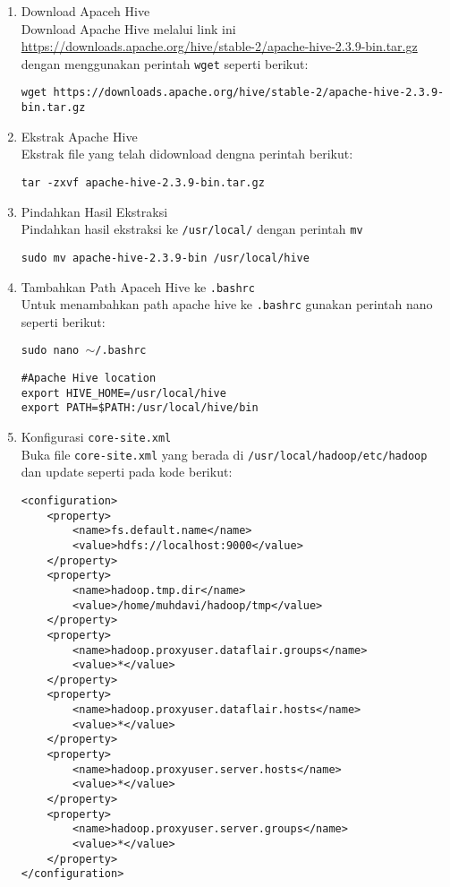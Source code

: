 \documentclass[a4paper]{tufte-handout}
\begin{document}
\begin{enumerate}
\item Download Apaceh Hive \\
Download Apache Hive melalui link ini \url{https://downloads.apache.org/hive/stable-2/apache-hive-2.3.9-bin.tar.gz} dengan menggunakan perintah {\tt wget} seperti berikut:

{\tt wget https://downloads.apache.org/hive/stable-2/apache-hive-2.3.9-bin.tar.gz}

\item Ekstrak Apache Hive \\
Ekstrak file yang telah didownload dengna perintah berikut:

{\tt tar -zxvf apache-hive-2.3.9-bin.tar.gz}

\item Pindahkan Hasil Ekstraksi \\
Pindahkan hasil ekstraksi ke {\tt /usr/local/} dengan perintah {\tt mv}

{\tt sudo mv apache-hive-2.3.9-bin /usr/local/hive}

\item Tambahkan Path Apaceh Hive ke {\tt .bashrc} \\
Untuk menambahkan path apache hive ke {\tt .bashrc} gunakan perintah nano
seperti berikut:

{\tt sudo nano $\sim$/.bashrc}

\begin{lstlisting}
#Apache Hive location
export HIVE_HOME=/usr/local/hive
export PATH=$PATH:/usr/local/hive/bin
\end{lstlisting}

\item Konfigurasi {\tt core-site.xml} \\
Buka file {\tt core-site.xml} yang berada di {\tt /usr/local/hadoop/etc/hadoop} dan update seperti pada kode berikut:

\begin{lstlisting}
<configuration>
	<property>
		<name>fs.default.name</name>
		<value>hdfs://localhost:9000</value>
	</property>
	<property>
		<name>hadoop.tmp.dir</name>
		<value>/home/muhdavi/hadoop/tmp</value>
	</property>
	<property>
		<name>hadoop.proxyuser.dataflair.groups</name>
		<value>*</value>
	</property>
	<property>
		<name>hadoop.proxyuser.dataflair.hosts</name>
		<value>*</value>
	</property>
	<property>
		<name>hadoop.proxyuser.server.hosts</name>
		<value>*</value>
	</property>
	<property>
		<name>hadoop.proxyuser.server.groups</name>
		<value>*</value>
	</property>
</configuration>
\end{lstlisting}


\end{enumerate}
\end{document}
